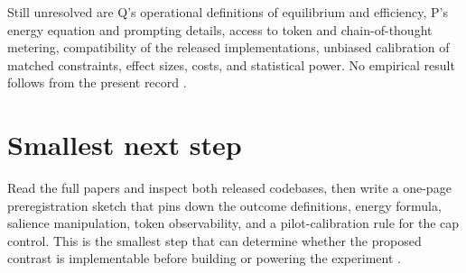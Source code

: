 \documentclass{article}
\begin{document}
Still unresolved are Q's operational definitions of equilibrium and efficiency, P's energy equation and prompting details, access to token and chain-of-thought metering, compatibility of the released implementations, unbiased calibration of matched constraints, effect sizes, costs, and statistical power.  No empirical result follows from the present record .

\section{Smallest next step}

Read the full papers and inspect both released codebases, then write a one-page preregistration sketch that pins down the outcome definitions, energy formula, salience manipulation, token observability, and a pilot-calibration rule for the cap control.  This is the smallest step that can determine whether the proposed contrast is implementable before building or powering the experiment .
\end{document}
